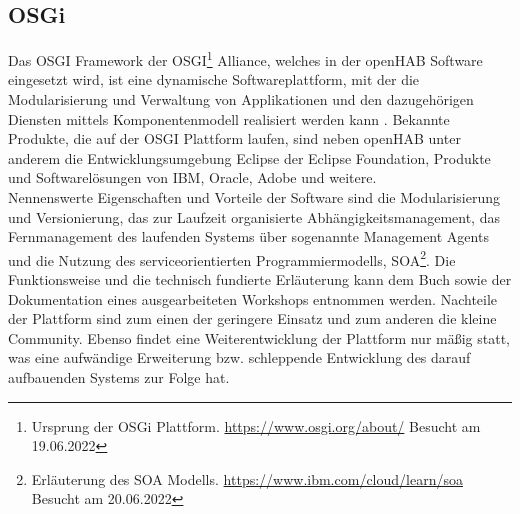     \subsection{OSGi}
    \label{subsec:osgiFramework}
        Das \ac{OSGI} Framework der \acs{OSGI}\footnote{Ursprung der OSGi Plattform. \url{https://www.osgi.org/about/} Besucht am 19.06.2022} 
        Alliance, welches in der openHAB Software eingesetzt wird, ist eine dynamische Softwareplattform, mit der die Modularisierung 
        und Verwaltung von Applikationen und den dazugehörigen Diensten mittels Komponentenmodell realisiert werden kann \cite{funke2009}. Bekannte 
        Produkte, die auf der \acs{OSGI} Plattform laufen, sind neben openHAB unter anderem die Entwicklungsumgebung Eclipse der Eclipse 
        Foundation, Produkte und Softwarelösungen von IBM, Oracle, Adobe und weitere. 
        \\
        Nennenswerte Eigenschaften und Vorteile der Software sind die Modularisierung und Versionierung, das zur Laufzeit organisierte 
        Abhängigkeitsmanagement, das Fernmanagement des laufenden Systems über sogenannte Management Agents und die Nutzung des 
        serviceorientierten Programmiermodells, \ac{SOA}\footnote{Erläuterung des SOA Modells. \url{https://www.ibm.com/cloud/learn/soa} Besucht am 20.06.2022}. 
        Die Funktionsweise und die technisch 
        fundierte Erläuterung kann dem Buch \cite{osgibuch} sowie der Dokumentation \cite{osgipraesentation} eines ausgearbeiteten Workshops entnommen werden. 
        Nachteile der Plattform sind zum einen der geringere Einsatz und zum anderen die kleine Community. 
        Ebenso findet eine Weiterentwicklung der Plattform nur mäßig statt, was eine aufwändige Erweiterung bzw. schleppende Entwicklung des darauf 
        aufbauenden Systems zur Folge hat. 

